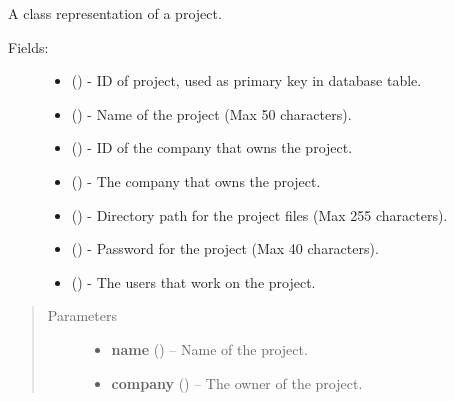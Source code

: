 \documentclass[letterpaper,10pt,english]{sphinxmanual}
\begin{document}
\begin{fulllineitems}
\label{models:models.Project}
A class representation of a project.
\begin{description}
\item[{Fields:}] \leavevmode\begin{itemize}
\item {} 
        ()        - ID of project, used as primary key in database table.

\item {} 
        ()        - Name of the project (Max 50 characters).

\item {} 
        ()        - ID of the company that owns the project.

\item {} 
 ()        - The company that owns the project.

\item {} 
        ()        - Directory path for the project files (Max 255 characters).

\item {} 
        ()        - Password for the project (Max 40 characters).

\item {} 
 ()        - The users that work on the project.

\end{itemize}

\end{description}
\begin{quote}\begin{description}
\item[{Parameters}] \leavevmode\begin{itemize}
\item {} 
\textbf{name} () -- Name of the project.

\item {} 
\textbf{company} ({\hyperref[models:models.Company]{}}) -- The owner of the project.

\end{itemize}

\end{description}\end{quote}

\end{fulllineitems}
\end{document}
